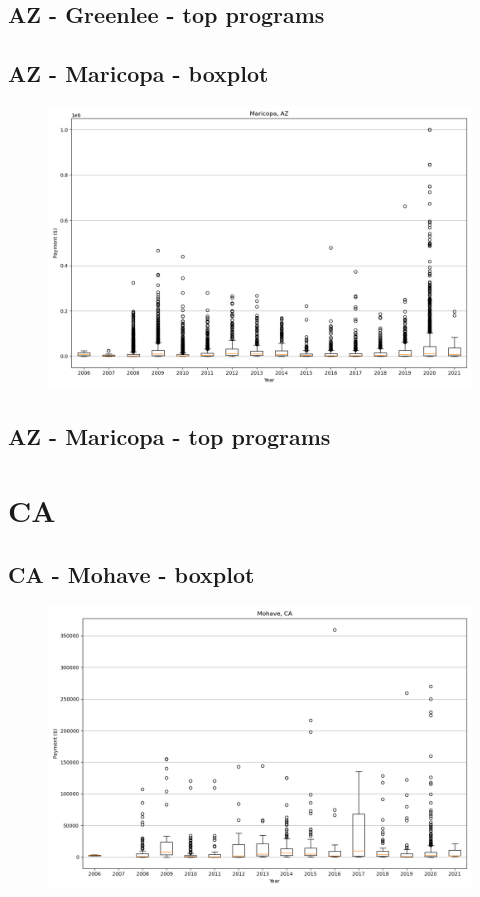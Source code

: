 \subsection*{AZ - Greenlee - top programs}

\newpage
\subsection*{AZ - Maricopa - boxplot}
\begin{figure}[h]
\centering
\includegraphics[width=7in]{../output/boxplots/counties/Maricopa-AZ_boxplot.png}
\end{figure}


\subsection*{AZ - Maricopa - top programs}

\newpage
\section*{CA}
\subsection*{CA - Mohave - boxplot}
\begin{figure}[h]
\centering
\includegraphics[width=7in]{../output/boxplots/counties/Mohave-CA_boxplot.png}
\end{figure}


